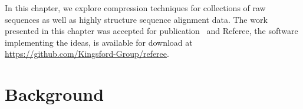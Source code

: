 \documentclass[12pt]{cmuthesis}
\newcommand{\refer}{\textsc{Referee}\xspace}
\begin{document}



In this chapter, we explore compression techniques for collections of raw sequences as well as highly structure sequence alignment data. The work presented in this chapter was accepted for publication~\cite{Referee_draft} and Referee, the software implementing the ideas, is available for download at \url{https://github.com/Kingsford-Group/referee}.



\section{Background}



\end{document}
